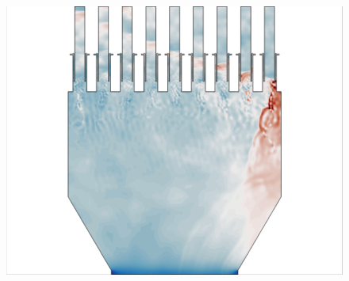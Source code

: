 \begin{figure}
{\begin{minipage}{0.32\linewidth}
		\includegraphics[width=0.99\linewidth,trim={0.5em 0.5em 15.0em 0.5em},clip]{Chapters/HPROMResults/Images/nineElem/deim/contours/deim_0p005_pressure_z.png}
	\end{minipage}
	}


\end{figure}
